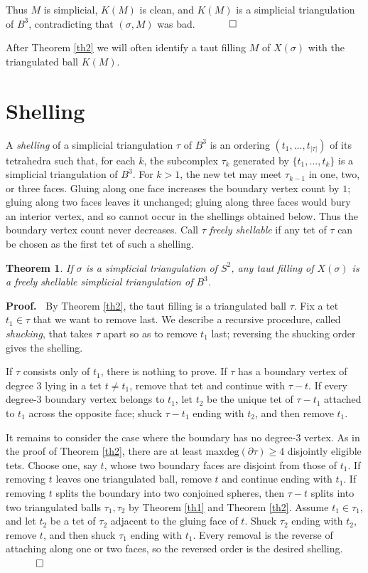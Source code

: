 \documentclass[12pt]{article}
\newtheorem{theorem}{Theorem}
\newcommand{\proofstart}{{\noindent \bf Proof.\ }}
\newcommand{\proofend}{$\quad \qed$}
\newcommand{\kw}{\mathrm}
\newcommand{\maxdeg}{\kw{maxdeg}}
\begin{document}
Thus $M$ is simplicial, $K(M)$ is clean, and $K(M)$ is a simplicial
triangulation of $B^3$, contradicting that $(\sigma,M)$ was bad.
\proofend

After Theorem \ref{th2} we will often identify a taut filling $M$ of
$X(\sigma)$ with the triangulated ball $K(M)$.

\section{Shelling}

A \emph{shelling} of a simplicial triangulation $\tau$ of $B^3$
is an ordering
$(t_1,\ldots,t_{|\tau|})$
of its tetrahedra such that, for each $k$,
the subcomplex $\tau_k$ generated by $\{t_1,\ldots,t_k\}$ is a
simplicial triangulation of $B^3$.
For $k>1$, the new tet may meet $\tau_{k-1}$ in one, two, or three
faces. Gluing along one face increases the boundary vertex count by $1$;
gluing along two faces leaves it unchanged; gluing along three faces
would bury an interior vertex, and so cannot occur in the shellings
obtained below. Thus the boundary vertex count never decreases.
Call $\tau$ \emph{freely shellable} if any tet of $\tau$ can be chosen as
the first tet of such a shelling.

\begin{theorem} \label{th3}
If $\sigma$ is a simplicial triangulation of $S^2$,
any taut filling of $X(\sigma)$ is a freely shellable
simplicial triangulation of $B^3$.
\end{theorem}

\proofstart
By Theorem \ref{th2}, the taut filling is a triangulated ball $\tau$.
Fix a tet $t_1 \in \tau$ that we want to remove last.  We describe a
recursive procedure, called \emph{shucking}, that takes $\tau$ apart
so as to remove $t_1$ last; reversing the shucking order gives the
shelling.

If $\tau$ consists only of $t_1$, there is nothing to prove.
If $\tau$ has a boundary vertex of degree $3$ lying in a tet
$t\ne t_1$, remove that tet and continue with $\tau-t$.
If every degree-$3$ boundary vertex belongs to $t_1$, let $t_2$ be the
unique tet of $\tau-t_1$ attached to $t_1$ across the opposite face;
shuck $\tau-t_1$ ending with $t_2$, and then remove $t_1$.

It remains to consider the case where the boundary has no degree-$3$
vertex.  As in the proof of Theorem \ref{th2}, there are at least
$\maxdeg(\partial \tau)\geq 4$ disjointly eligible tets.
Choose one, say $t$, whose two boundary faces are disjoint from those of
$t_1$.
If removing $t$ leaves one triangulated ball, remove $t$ and continue
ending with $t_1$.
If removing $t$ splits the boundary into two conjoined spheres, then
$\tau-t$ splits into two triangulated balls $\tau_1,\tau_2$ by
Theorem \ref{th1} and Theorem \ref{th2}.
Assume $t_1\in \tau_1$, and let $t_2$ be a tet of $\tau_2$ adjacent to
the gluing face of $t$.
Shuck $\tau_2$ ending with $t_2$, remove $t$, and then shuck
$\tau_1$ ending with $t_1$.
Every removal is the reverse of attaching along one or two faces, so the
reversed order is the desired shelling.
\proofend
\end{document}
